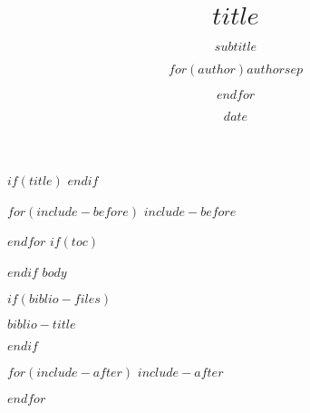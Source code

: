 \documentclass[11pt,professionalfonts,t]{beamer}
\title{$title$}
\subtitle{$subtitle$}
\author{$for(author)$$author$$sep$ \and $endfor$}
\institute{$for(institute)$$institute$$sep$ \and $endfor$}
\date{$date$}
\begin{document}
$if(title)$
\frame{\titlepage}
$endif$

$for(include-before)$
$include-before$

$endfor$
$if(toc)$
\begin{frame}
\tableofcontents[hideallsubsections]
\end{frame}

$endif$
$body$

$if(biblio-files)$
\begin{frame}[allowframebreaks]{$biblio-title$}
\printbibliography[heading=none]
\end{frame}
$endif$

$for(include-after)$
$include-after$

$endfor$
\end{document}
